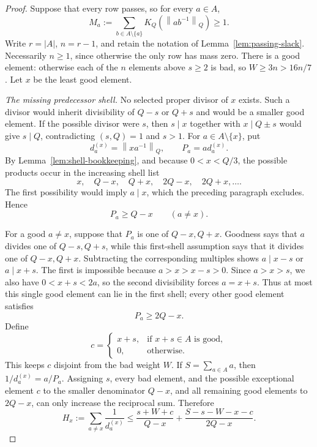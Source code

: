 \documentclass[11pt]{article}
\theoremstyle{definition}
\theoremstyle{remark}
\newcommand{\normQ}[1]{\left\lVert #1\right\rVert_Q}
\begin{document}
\begin{proof}
Suppose that every row passes, so for every \(a\in A\),
\[
 M_a:=\sum_{b\in A\setminus\{a\}}
 K_Q\!\left(\normQ{ab^{-1}}\right)\ge1.
\]
Write \(r=|A|\), \(n=r-1\), and retain the notation of
Lemma~\ref{lem:passing-slack}.  Necessarily \(n\ge1\), since otherwise the
only row has mass zero.  There is a good element: otherwise each of
the \(n\) elements above \(s\ge2\) is bad, so \(W\ge3n>16n/7\).
Let \(x\) be the least good element.

\smallskip
\noindent\emph{The missing predecessor shell.}
No selected proper divisor of \(x\) exists.  Such a divisor would inherit
divisibility of \(Q-s\) or \(Q+s\) and would be a smaller good element.
If the possible divisor were \(s\), then \(s\mid x\) together with
\(x\mid Q\pm s\) would give \(s\mid Q\), contradicting \((s,Q)=1\) and
\(s>1\).
For \(a\in A\setminus\{x\}\), put
\[
 d_a^{(x)}=\normQ{xa^{-1}},\qquad P_a=ad_a^{(x)}.
\]
By Lemma~\ref{lem:shell-bookkeeping}, and because \(0<x<Q/3\), the
possible products occur in the increasing shell list
\begin{equation}\label{eq:s-positive-shell-list}
 x,\quad Q-x,\quad Q+x,\quad 2Q-x,\quad 2Q+x,\ldots.
\end{equation}
The first possibility would imply \(a\mid x\), which the preceding
paragraph excludes.  Hence
\begin{equation}\label{eq:s-positive-first-shell}
 P_a\ge Q-x\qquad(a\ne x).
\end{equation}

For a good \(a\ne x\), suppose that \(P_a\) is one of
\(Q-x,Q+x\).  Goodness says that \(a\) divides one of
\(Q-s,Q+s\), while this first-shell assumption says that it divides one
of \(Q-x,Q+x\).  Subtracting the corresponding multiples shows
\(a\mid x-s\) or \(a\mid x+s\).  The first is impossible because
\(a>x>x-s>0\).  Since \(a>x>s\), we also have \(0<x+s<2a\), so the
second divisibility forces \(a=x+s\).  Thus at most this single good
element can lie in the first shell; every other good element satisfies
\begin{equation}\label{eq:s-positive-far-shell}
 P_a\ge2Q-x.
\end{equation}
Define
\[
 c=\begin{cases}
 x+s,&\text{if }x+s\in A\text{ is good},\\
 0,&\text{otherwise}.
 \end{cases}
\]
This keeps \(c\) disjoint from the bad weight \(W\).  If
\(S=\sum_{a\in A}a\), then \(1/d_a^{(x)}=a/P_a\).  Assigning
\(s\), every bad element, and the possible exceptional element \(c\) to
the smaller denominator \(Q-x\), and all remaining good elements to
\(2Q-x\), can only increase the reciprocal sum.  Therefore
\begin{equation}\label{eq:s-positive-H}
 H_x:=\sum_{a\ne x}\frac1{d_a^{(x)}}
 \le\frac{s+W+c}{Q-x}
 +\frac{S-s-W-x-c}{2Q-x}.
\end{equation}


\end{proof}
\end{document}
